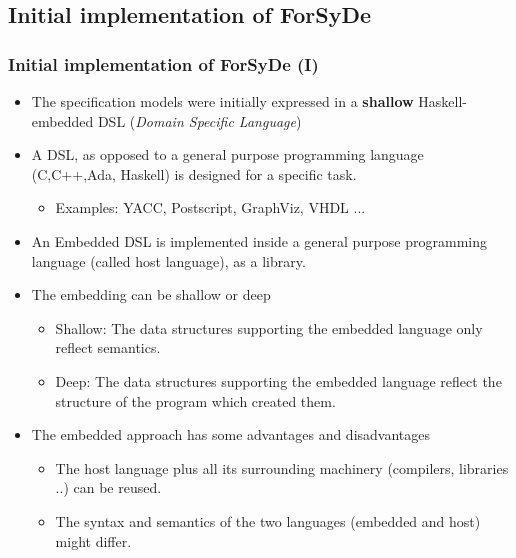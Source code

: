 \documentclass{beamer}
\begin{document}
\beamerdefaultoverlayspecification{<+->}

\subsection{Initial implementation of ForSyDe}
\begin{frame}
  \frametitle{Initial implementation of ForSyDe (I)}

  \begin{itemize}
  \item The specification models were initially expressed in a
    \textbf{shallow} Haskell-embedded DSL (\textit{Domain Specific
      Language})
  \item A DSL, as opposed to a general purpose
    programming language (C,C++,Ada, Haskell) is designed for a specific task.
    \begin{itemize}
    \item Examples: YACC, Postscript, GraphViz, VHDL ...   
    \end{itemize}
  \item An Embedded DSL  is implemented inside
    a general purpose programming language (called host language), as a library.
  \item The embedding can be shallow or deep
    \begin{itemize}
    \item Shallow: The data structures supporting the embedded
      language only reflect semantics.
    \item Deep: The data structures supporting the embedded language reflect
       the structure of the program which created them.
    \end{itemize}
  \item The embedded approach has some advantages and disadvantages
    \begin{itemize}
    \item The host language plus all its surrounding machinery
      (compilers, libraries ..) can be reused.
    \item The syntax and semantics of the two languages (embedded and host)
      might differ.
    \end{itemize}
  \end{itemize}
\end{frame}
\end{document}
